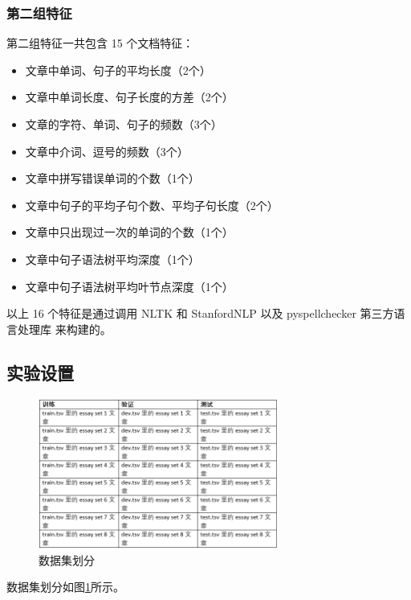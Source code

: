 \documentclass[UTF8]{article}
\begin{document}
\subsubsection{第二组特征}
第二组特征一共包含 15 个文档特征：

\begin{itemize}
    \item 文章中单词、句子的平均长度（2个）
    \item 文章中单词长度、句子长度的方差（2个）
    \item 文章的字符、单词、句子的频数（3个）
    \item 文章中介词、逗号的频数（3个）
    \item 文章中拼写错误单词的个数（1个）
    \item 文章中句子的平均子句个数、平均子句长度（2个）
    \item 文章中只出现过一次的单词的个数（1个）
    \item 文章中句子语法树平均深度（1个）
    \item 文章中句子语法树平均叶节点深度（1个）
\end{itemize}

以上 16 个特征是通过调用 NLTK 和 StanfordNLP 以及 pyspellchecker 第三方语言处理库
来构建的。

\subsection{实验设置}

\begin{figure}[h]
    \centering
    \includegraphics[width=0.7\textwidth]{fig/11.png}
    \caption{数据集划分}
    \label{fig:HW1}
\end{figure}

数据集划分如图\ref{fig:HW1}所示。
\end{document}
